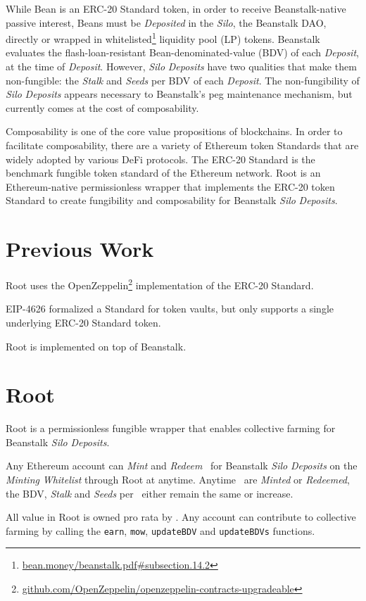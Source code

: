 \documentclass[tikz]{article}
\newcommand{\code}[1]{\texttt{#1}}
\newcommand{\term}[1]{\textsl{#1}}
\newcommand{\fref}[1]{\footnote{\href{http://#1}{#1}}}
\newcommand{\Root}{} %
\begin{document}
While Bean is an ERC-20 Standard token, in order to receive Beanstalk-native passive interest, Beans must be \term{Deposited} in the \term{Silo}, the Beanstalk DAO, directly or wrapped in whitelisted\fref{bean.money/beanstalk.pdf\#subsection.14.2} liquidity pool (LP) tokens. Beanstalk evaluates the flash-loan-resistant Bean-denominated-value (BDV) of each \term{Deposit}, at the time of \term{Deposit}. However, \term{Silo} \term{Deposits} have two qualities that make them non-fungible: the \term{Stalk} and \term{Seeds} per BDV of each \term{Deposit}. The non-fungibility of \term{Silo} \term{Deposits} appears necessary to Beanstalk's peg maintenance mechanism, but currently comes at the cost of composability. 

Composability is one of the core value propositions of blockchains. In order to facilitate composability, there are a variety of Ethereum token Standards that are widely adopted by various DeFi protocols. The ERC-20 Standard is the benchmark fungible token standard of the Ethereum network. Root is an Ethereum-native permissionless wrapper that implements the ERC-20 token Standard to create fungibility and composability for Beanstalk \term{Silo} \term{Deposits}.

\section{Previous Work}
Root uses the OpenZeppelin\fref{github.com/OpenZeppelin/openzeppelin-contracts-upgradeable} implementation of the ERC-20 Standard.

EIP-4626 formalized a Standard for token vaults, but only supports a single underlying ERC-20 Standard token. 

Root is implemented on top of Beanstalk. 

\section{Root}
Root is a permissionless fungible wrapper that enables collective farming for Beanstalk \term{Silo} \term{Deposits}. 

Any Ethereum account can \term{Mint} and \term{Redeem} \Root\ for Beanstalk \term{Silo} \term{Deposits} on the \term{Minting} \term{Whitelist} through Root at anytime. Anytime \Root\ are \term{Minted} or \term{Redeemed}, the BDV, \term{Stalk} and \term{Seeds} per \Root\ either remain the same or increase. 

All value in Root is owned pro rata by \Root. Any account can contribute to collective farming by calling the \code{earn}, \code{mow}, \code{updateBDV} and \code{updateBDVs} functions.
\end{document}
